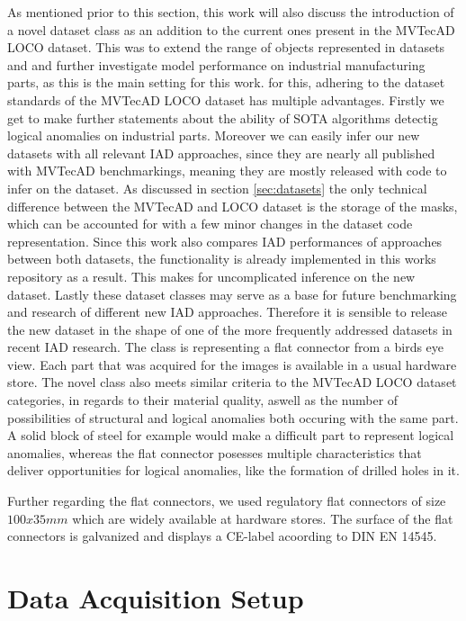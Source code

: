 As mentioned prior to this section, this work will also discuss the introduction of a novel dataset class as an addition to the current ones present in the MVTecAD LOCO dataset.
This was to extend the range of objects represented in datasets \cite{MVTEC_Bergmann_2021} and \cite{LOCODentsAndScratchesBergmann2022} and further investigate model performance on industrial manufacturing parts, as this is the 
main setting for this work. for this, adhering to the dataset standards of the MVTecAD LOCO dataset has multiple advantages. Firstly we get to make further statements about the ability of SOTA algorithms detectig 
logical anomalies on industrial parts. Moreover we can easily infer our new datasets with all relevant IAD approaches, since they are nearly all published with MVTecAD benchmarkings, meaning 
they are mostly released with code to infer on the dataset. As discussed in section \ref{sec:datasets} the only technical difference between the MVTecAD and LOCO dataset is the storage of the masks, 
which can be accounted for with a few minor changes in the dataset code representation. Since this work also compares IAD performances of approaches between both datasets, the functionality 
is already implemented in this works repository as a result. This makes for uncomplicated inference on the new dataset. Lastly these dataset classes may serve as a base for future benchmarking 
and research of different new IAD approaches. Therefore it is sensible to release the new dataset in the shape of one of the more frequently addressed datasets in recent IAD research. 
The class is representing a flat connector from a birds eye view. Each part that was acquired for the images is available in a 
usual hardware store. The novel class also 
meets similar criteria to the MVTecAD LOCO dataset categories, in regards to their material quality, aswell as the number of possibilities of structural and logical anomalies both occuring with the same part. A solid block of steel for example 
would make a difficult part to represent logical anomalies, whereas the flat connector posesses multiple characteristics that deliver opportunities for logical anomalies, like the formation of drilled holes in it.

Further regarding the flat connectors, we used regulatory flat connectors of size $100x35 mm$ which are widely available at hardware stores. The surface of the flat connectors is galvanized 
and displays a CE-label acoording to DIN EN 14545.




\section{Data Acquisition Setup}
\label{sec:faltconnectordataacquisiton}


